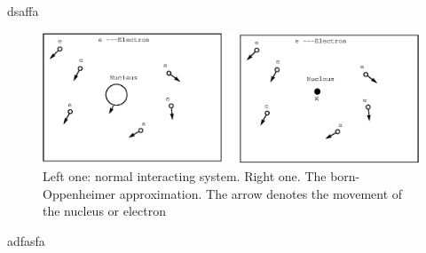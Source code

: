 \documentclass[a4paper]{report}
\begin{document}
dsaffa
\begin{figure}[!htb]
\centering
\includegraphics[scale=.5]{system.eps}
\caption{Left one: normal interacting system. Right one. The born-Oppenheimer approximation. The arrow denotes the movement of the nucleus or electron}
\label{fig:bo}
\end{figure}
adfasfa
\end{document}
